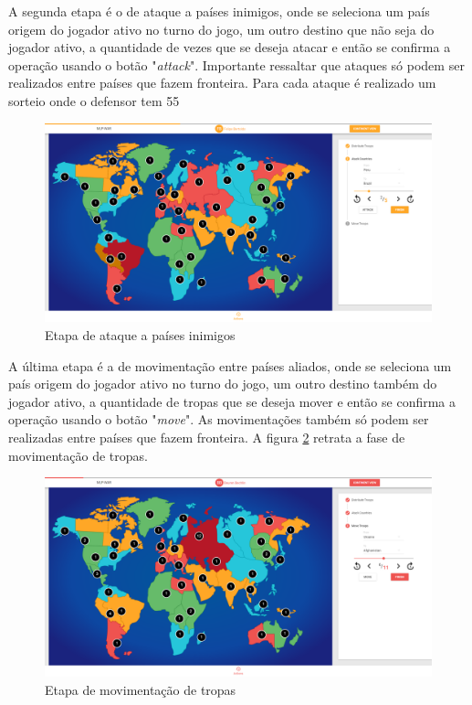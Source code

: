\documentclass[rel_mlp]{iiufrgs}
\begin{document}
A segunda etapa é o de ataque a países inimigos, onde se seleciona um país origem do jogador ativo no turno do jogo, um outro destino que não seja do jogador ativo, a quantidade de vezes que se deseja atacar e então se confirma a operação usando o botão "\textit{attack}". Importante ressaltar que ataques só podem ser realizados entre países que fazem fronteira. Para cada ataque é realizado um sorteio onde o defensor tem 55%

\begin{figure}[h!]
\centering
  \includegraphics[width=1.0\textwidth]{images/attack.png}
  \caption{Etapa de ataque a países inimigos}
  \label{fig:attack}
\end{figure}

A última etapa é a de movimentação entre países aliados, onde se seleciona um país origem do jogador ativo no turno do jogo, um outro destino também do jogador ativo, a quantidade de tropas que se deseja mover e então se confirma a operação usando o botão "\textit{move}". As movimentações também só podem ser realizadas entre países que fazem fronteira.
A figura \ref{fig:move} retrata a fase de movimentação de tropas.

\begin{figure}[h!]
\centering
  \includegraphics[width=1.0\textwidth]{images/move.png}
  \caption{Etapa de movimentação de tropas}
  \label{fig:move}
\end{figure}
\end{document}
